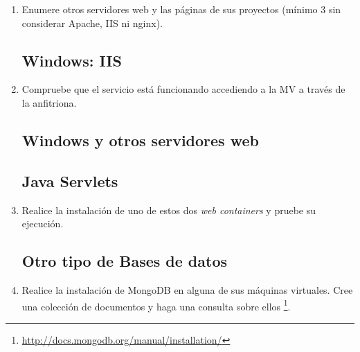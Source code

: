 \documentclass[paper=a4, fontsize=11pt]{scrartcl} %
\numberwithin{equation}{section} %
\numberwithin{figure}{section} %
\numberwithin{table}{section} %
\begin{document}
\begin{enumerate}
		\item Enumere otros servidores web y las páginas de sus proyectos (mínimo 3 sin considerar
		Apache, IIS ni nginx).
		
	
	\subsection{Windows: IIS}
		\item Compruebe que el servicio está funcionando accediendo a la MV a través de la anfitriona.
	\subsection{Windows y otros servidores web}
	\subsection{Java Servlets}
		\item Realice la instalación de uno de estos dos \textit{web containers} y pruebe su ejecución.
	
	\subsection{Otro tipo de Bases de datos}
		\item Realice la instalación de MongoDB en alguna de sus máquinas virtuales. Cree una colección
		de documentos y haga una consulta sobre ellos
		\footnote{\url{http://docs.mongodb.org/manual/installation/}}.
	

\end{enumerate}
\end{document}
